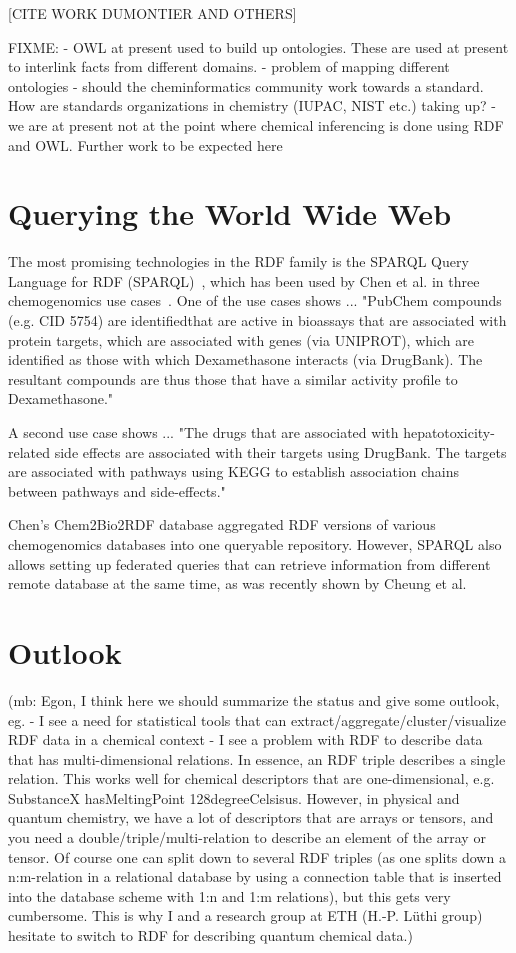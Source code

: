 \documentclass[10pt]{bmc_article}
\newenvironment{bmcformat}{\begin{raggedright}\baselineskip20pt\sloppy\setboolean{publ}{false}}{\end{raggedright}\baselineskip20pt\sloppy}
\begin{document}
\begin{bmcformat}
[CITE WORK DUMONTIER AND OTHERS]

FIXME:
- OWL at present used to build up ontologies. These are used at present to
interlink facts from different domains. 
- problem of mapping different ontologies - should the cheminformatics community
work towards a standard. How are standards organizations in chemistry (IUPAC,
NIST etc.) taking up?
- we are at present not at the point where chemical inferencing is done using
RDF and OWL. Further work to be expected here


\section{Querying the World Wide Web}

The most promising technologies in the RDF family is the
SPARQL Query Language for RDF (SPARQL)~\cite{PrudHommeaux2008}, which has been
used by Chen et al. in three chemogenomics use cases~\cite{CHE2010}. 
One of the use cases shows ... "PubChem compounds (e.g. CID 5754) are identifiedthat are active in bioassays that are associated with protein targets, which are associated with genes (via UNIPROT), which are identified as those with which Dexamethasone interacts (via DrugBank). The resultant compounds are thus those that have a similar activity profile to Dexamethasone."

A second use case shows ... "The drugs that are associated with hepatotoxicity-related side effects are associated with their targets using DrugBank. The targets are associated with pathways using KEGG to establish association chains between pathways and side-effects."

Chen's Chem2Bio2RDF database aggregated RDF versions of various chemogenomics databases
into one queryable repository. However, SPARQL also allows setting up federated
queries that can retrieve information from different remote database at the same
time, as was recently shown by Cheung et al.~\cite{Cheung2009}

\section{Outlook}

(mb: Egon, I think here we should summarize the status and give some outlook, eg. 
- I see a need for statistical tools that can
extract/aggregate/cluster/visualize RDF data in a chemical context
- I see a problem with RDF to describe data that has multi-dimensional
relations. In essence, an RDF triple describes a single relation. This works
well for chemical descriptors that are one-dimensional, e.g. SubstanceX
hasMeltingPoint 128degreeCelsisus. However, in physical and quantum chemistry,
we have a lot of descriptors that are arrays or tensors, and you need a
double/triple/multi-relation to describe an element of the array or tensor. Of
course one can split down to several RDF triples (as one splits down a
n:m-relation in a relational database by using a connection table that is
inserted into the database scheme with 1:n and 1:m relations), but this gets
very cumbersome. This is why I and a research group at ETH (H.-P. Lüthi group)
hesitate to switch to RDF for describing quantum chemical data.)



\end{bmcformat}
\end{document}
